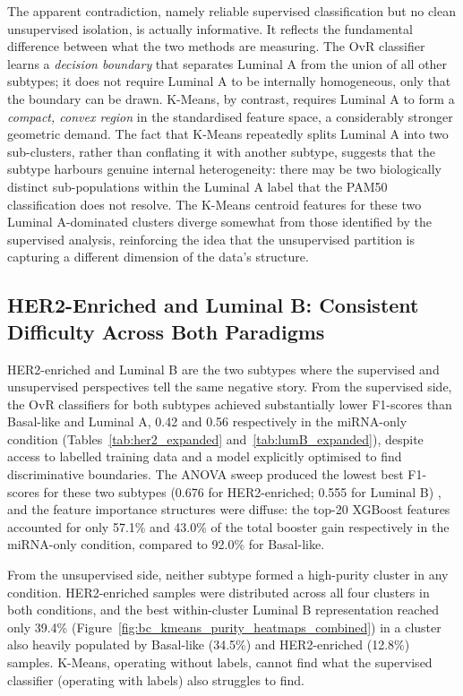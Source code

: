 The apparent contradiction, namely reliable supervised classification but no clean
unsupervised isolation, is actually informative. It reflects the fundamental
difference between what the two methods are measuring. The OvR classifier learns a
\textit{decision boundary} that separates Luminal A from the union of all other
subtypes; it does not require Luminal A to be internally homogeneous, only that the
boundary can be drawn. K-Means, by contrast, requires Luminal A to form a
\textit{compact, convex region} in the standardised feature space, a considerably
stronger geometric demand. The fact that K-Means repeatedly splits Luminal A into
two sub-clusters, rather than conflating it with another subtype, suggests that the
subtype harbours genuine internal heterogeneity: there may be two biologically
distinct sub-populations within the Luminal A label that the PAM50 classification
does not resolve. The K-Means centroid features for these two Luminal A-dominated
clusters diverge somewhat from those identified by the supervised analysis,
reinforcing the idea that the unsupervised partition is capturing a different
dimension of the data's structure.

\subsection{HER2-Enriched and Luminal B: Consistent Difficulty Across Both Paradigms}

HER2-enriched and Luminal B are the two subtypes where the supervised and
unsupervised perspectives tell the same negative story. From the supervised side,
the OvR classifiers for both subtypes achieved substantially lower F1-scores than
Basal-like and Luminal A, 0.42 and 0.56 respectively in the miRNA-only condition 
(Tables~\ref{tab:her2_expanded} and~\ref{tab:lumB_expanded}),
despite access to labelled training data and a model explicitly optimised to find
discriminative boundaries. The ANOVA sweep produced the lowest best F1-scores for
these two subtypes (0.676 for HER2-enriched; 0.555 for Luminal B) , and the feature
importance structures were diffuse: the top-20 XGBoost features  accounted for only
57.1\% and 43.0\% of the total booster gain respectively in the miRNA-only condition,
compared to 92.0\% for Basal-like.

From the unsupervised side, neither subtype formed a high-purity cluster in any
condition. HER2-enriched samples were distributed across all four clusters in both
conditions, and the best within-cluster Luminal B representation reached only 39.4\%
(Figure~\ref{fig:bc_kmeans_purity_heatmaps_combined}) in a cluster also heavily populated by Basal-like (34.5\%) and HER2-enriched
(12.8\%) samples. K-Means, operating without labels, cannot find what the supervised
classifier (operating with labels) also struggles to find.


